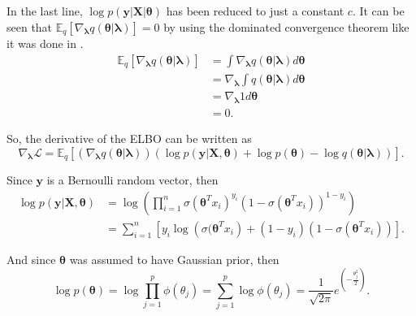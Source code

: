 In the last line, $\log p(\boldsymbol{y} | \boldsymbol{X} | \boldsymbol{\theta})$ has been reduced to just a constant $c$. It can be seen that $\mathbb{E}_q \left[ \nabla_{\boldsymbol{\lambda}} q(\boldsymbol{\theta} | \boldsymbol{\lambda}) \right] = 0$ by using the dominated convergence theorem like it was done in \cite{ranganath2014black}.
\begin{equation}
  \begin{split}
      \mathbb{E}_q \left[ \nabla_{\boldsymbol{\lambda}} q(\boldsymbol{\theta} | \boldsymbol{\lambda}) \right] &=
      \int \nabla_{\boldsymbol{\lambda}} q(\boldsymbol{\theta} | \boldsymbol{\lambda}) d\boldsymbol{\theta} \\
      &= \nabla_{\boldsymbol{\lambda}} \int q(\boldsymbol{\theta} | \boldsymbol{\lambda}) d\boldsymbol{\theta} \\
      &= \nabla_{\boldsymbol{\lambda}} 1 d\boldsymbol{\theta} \\
      &= 0.
  \end{split}
\end{equation}

So, the derivative of the ELBO can be written as
\begin{equation}
  \nabla_{\boldsymbol{\lambda}} \mathcal{L} = \mathbb{E}_q \left[ \left( \nabla_{\boldsymbol{\lambda}} q(\boldsymbol{\theta} | \boldsymbol{\lambda}) \right) \left( \log p(\boldsymbol{y} | \boldsymbol{X}, \boldsymbol{\theta}) + \log p(\boldsymbol{\theta}) - \log q(\boldsymbol{\theta} | \boldsymbol{\lambda}) \right) \right].
\end{equation}

Since $\boldsymbol{y}$ is a Bernoulli random vector, then
\begin{equation}
  \begin{split}
      \log p(\boldsymbol{y} | \boldsymbol{X}, \boldsymbol{\theta}) &=
      \log \left( \prod_{i = 1}^n \sigma(\boldsymbol{\theta}^T x_i)^{y_i} (1 - \sigma(\boldsymbol{\theta}^T x_i))^{1-y_i} \right) \\
      &= \sum_{i = 1}^n \left[ y_i \log \left( \sigma(\boldsymbol{\theta}^T x_i \right) + (1 - y_i) (1 - \sigma(\boldsymbol{\theta}^T x_i)) \right].
  \end{split}
\end{equation}

And since $\boldsymbol{\theta}$ was assumed to have Gaussian prior, then
\begin{equation}
  \log p(\boldsymbol{\theta}) = \log \prod_{j = 1}^p \phi(\theta_j) = \sum_{j = 1}^p \log \phi(\theta_j) = \frac{1}{\sqrt{2 \pi}} e^{\left( -\frac{\theta_j^2}{2} \right)}.
\end{equation}

